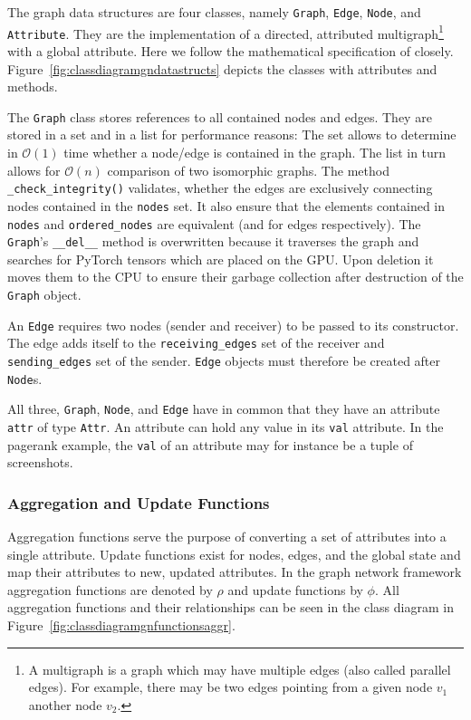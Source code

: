 The graph data structures are four classes, namely \texttt{Graph}, \texttt{Edge}, \texttt{Node}, and \texttt{Attribute}. They are the implementation of a directed, attributed multigraph\footnote{A multigraph is a graph which may have multiple edges (also called parallel edges). For example, there may be two edges pointing from a given node $v_1$ another node $v_2$.} with a global attribute. Here we follow the mathematical specification of \cite{deepmind:graphnets} closely. Figure~\ref{fig:classdiagramgndatastructs} depicts the classes with attributes and methods.

The \texttt{Graph} class stores references to all contained nodes and edges. They are stored in a set and in a list for performance reasons: The set allows to determine in $\mathcal{O}(1)$ time whether a node/edge is contained in the graph. The list in turn allows for $\mathcal{O}(n)$ comparison of two isomorphic graphs. The method \texttt{\_check\_integrity()} validates, whether the edges are exclusively connecting nodes contained in the \texttt{nodes} set. It also ensure that the elements contained in \texttt{nodes} and \texttt{ordered\_nodes} are equivalent (and for edges respectively). The \texttt{Graph}'s \texttt{\_\_del\_\_} method is overwritten because it traverses the graph and searches for PyTorch tensors which are placed on the GPU. Upon deletion it moves them to the CPU to ensure their garbage collection after destruction of the \texttt{Graph} object.

An \texttt{Edge} requires two nodes (sender and receiver) to be passed to its constructor. The edge adds itself to the \texttt{receiving\_edges} set of the receiver and \texttt{sending\_edges} set of the sender. \texttt{Edge} objects must therefore be created after \texttt{Node}s.

All three, \texttt{Graph}, \texttt{Node}, and \texttt{Edge} have in common that they have an attribute \texttt{attr} of type \texttt{Attr}. An attribute can hold any value in its \texttt{val} attribute. In the pagerank example, the \texttt{val} of an attribute may for instance be a tuple of screenshots.

\subsubsection{Aggregation and Update Functions}

Aggregation functions serve the purpose of converting a set of attributes into a single attribute. Update functions exist for nodes, edges, and the global state and map their attributes to new, updated attributes. In the graph network framework aggregation functions are denoted by $\rho$ and update functions by $\phi$. All aggregation functions and their relationships can be seen in the class diagram in Figure~\ref{fig:classdiagramgnfunctionsaggr}.

